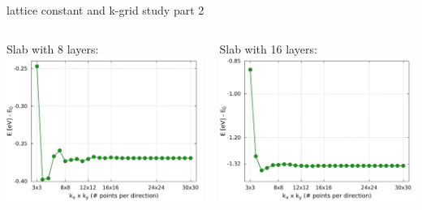\begin{frame}{lattice constant and k-grid study part 2}
\begin{columns}
\begin{column}{.4\linewidth}
		\end{column}
		\end{columns}
		\begin{columns}
		\begin{column}{.4\linewidth}
			\scriptsize{
				Slab with 8 layers:%
			}\\
			\includegraphics[width=\linewidth]{andere_bilder/kgrid_1x1x8_layers.pdf}
		\end{column}
		\begin{column}{.4\linewidth}
			\scriptsize{
				Slab with 16 layers: %
			} \\
			\includegraphics[width=\linewidth]{andere_bilder/kgrid_1x1x16_layers.pdf}
		\end{column}
	\end{columns}
\end{frame}

